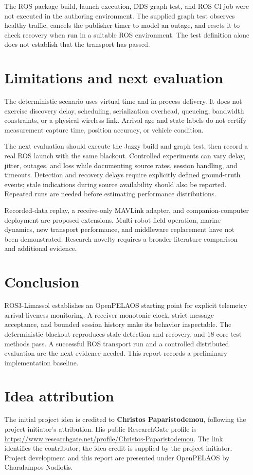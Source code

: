 \documentclass[11pt,a4paper]{article}
\begin{document}
The ROS package build, launch execution, DDS graph test, and ROS CI job were not
executed in the authoring environment. The supplied graph test observes healthy
traffic, cancels the publisher timer to model an outage, and resets it to check
recovery when run in a suitable ROS environment. The test definition alone does
not establish that the transport has passed.

\section{Limitations and next evaluation}
The deterministic scenario uses virtual time and in-process delivery. It does not
exercise discovery delay, scheduling, serialization overhead, queueing, bandwidth
constraints, or a physical wireless link. Arrival age and state labels do not
certify measurement capture time, position accuracy, or vehicle condition.

The next evaluation should execute the Jazzy build and graph test, then record
a real ROS launch with the same blackout. Controlled experiments can vary delay,
jitter, outages, and loss while documenting source rates, session handling, and
timeouts. Detection and recovery delays require explicitly defined ground-truth
events; stale indications during source availability should also be reported.
Repeated runs are needed before estimating performance distributions.

Recorded-data replay, a receive-only MAVLink adapter, and companion-computer
deployment are proposed extensions. Multi-robot field operation, marine dynamics,
new transport performance, and middleware replacement have not been demonstrated.
Research novelty requires a broader literature comparison and additional evidence.

\section{Conclusion}
ROS3-Limassol establishes an OpenPELAOS starting point for explicit telemetry
arrival-liveness monitoring. A receiver monotonic clock, strict message acceptance,
and bounded session history make its behavior inspectable. The deterministic
blackout reproduces stale detection and recovery, and 18 core test methods pass.
A successful ROS transport run and a controlled distributed evaluation are the
next evidence needed. This report records a preliminary implementation baseline.

\section*{Idea attribution}
The initial project idea is credited to \textbf{Christos Paparistodemou}, following
the project initiator's attribution. His public ResearchGate profile is
\url{https://www.researchgate.net/profile/Christos-Paparistodemou}.
The link identifies the contributor; the idea credit is supplied by the project
initiator. Project development and this report are presented under OpenPELAOS
by Charalampos Nadiotis.
\end{document}

